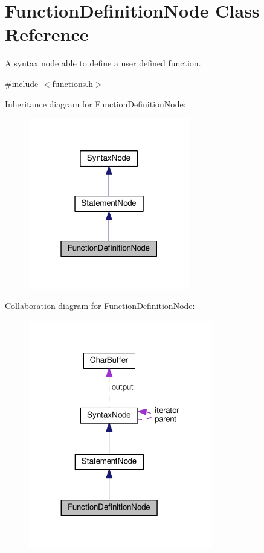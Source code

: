 \hypertarget{classFunctionDefinitionNode}{}\section{Function\+Definition\+Node Class Reference}
\label{classFunctionDefinitionNode}


A syntax node able to define a user defined function.  




{\ttfamily \#include $<$functions.\+h$>$}



Inheritance diagram for Function\+Definition\+Node\+:
\nopagebreak
\begin{figure}[H]
\begin{center}
\leavevmode
\includegraphics[width=199pt]{d0/d0b/classFunctionDefinitionNode__inherit__graph}
\end{center}
\end{figure}


Collaboration diagram for Function\+Definition\+Node\+:
\nopagebreak
\begin{figure}[H]
\begin{center}
\leavevmode
\includegraphics[width=227pt]{d4/dd4/classFunctionDefinitionNode__coll__graph}
\end{center}
\end{figure}
